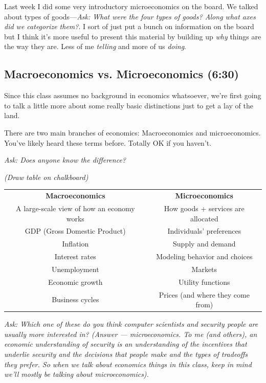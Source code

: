 \documentclass[11pt]{article}
\begin{document}
Last week I did some very introductory microeconomics on the board. We talked about types of goods---{\it Ask: What were the four types of goods? Along what axes did we categorize them?}. I sort of just put a bunch on information on the board but I think it's more useful to present this material by building up {\it why} things are the way they are. Less of me {\it telling} and more of us {\it doing}.

\subsection{Macroeconomics vs. Microeconomics (6:30)}

Since this class assumes no background in economics whatsoever, we're first going to talk a little more about some really basic distinctions just to get a lay of the land. 

There are two main branches of economics: Macroeconomics and microeconomics. You've likely heard these terms before. Totally OK if you haven't.

{\it Ask: Does anyone know the difference?}

{\it (Draw table on chalkboard)}

\begin{table}[H]
    \centering
    \begin{tabular}{c|c}
        \hline
        {\bf Macroeconomics} & {\bf Microeconomics} \\
        A large-scale view of how an economy works & How goods + services are allocated   \\ 
        \hline
        GDP (Gross Domestic Product) & Individuals' preferences \\
        Inflation & Supply and demand\\
        Interest rates & Modeling behavior and choices\\
        Unemployment & Markets \\ 
        Economic growth & Utility functions \\ 
        Business cycles & Prices (and where they come from)\\ 

        \hline
    \end{tabular}
\end{table}
        
{\it Ask: Which one of these do you think computer scientists and security people are usually more interested in? (Answer --- microeconomics. To me (and others), an economic understanding of security is an understanding of the incentives that underlie security and the decisions that people make and the types of tradeoffs they prefer. So when we talk about economics things in this class, keep in mind we'll mostly be talking about microeconomics).}
\end{document}
